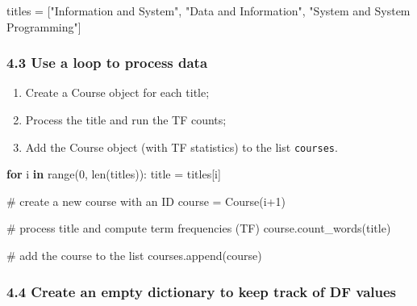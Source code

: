 \documentclass[
  letterpaper,
]{scrbook}
\newenvironment{Shaded}{\begin{snugshade}}{\end{snugshade}}
\newcommand{\BuiltInTok}[1]{\textcolor[rgb]{0.00,0.23,0.31}{#1}}
\newcommand{\CommentTok}[1]{\textcolor[rgb]{0.37,0.37,0.37}{#1}}
\newcommand{\ControlFlowTok}[1]{\textcolor[rgb]{0.00,0.23,0.31}{\textbf{#1}}}
\newcommand{\DecValTok}[1]{\textcolor[rgb]{0.68,0.00,0.00}{#1}}
\newcommand{\KeywordTok}[1]{\textcolor[rgb]{0.00,0.23,0.31}{\textbf{#1}}}
\newcommand{\NormalTok}[1]{\textcolor[rgb]{0.00,0.23,0.31}{#1}}
\newcommand{\OperatorTok}[1]{\textcolor[rgb]{0.37,0.37,0.37}{#1}}
\newcommand{\StringTok}[1]{\textcolor[rgb]{0.13,0.47,0.30}{#1}}
\providecommand{\tightlist}{%
  \setlength{\itemsep}{0pt}\setlength{\parskip}{0pt}}
\begin{document}
\begin{Shaded}
\begin{Highlighting}[]
\NormalTok{titles }\OperatorTok{=}\NormalTok{ [}\StringTok{"Information and System"}\NormalTok{, }\StringTok{"Data and Information"}\NormalTok{, }\StringTok{"System and System Programming"}\NormalTok{]}
\end{Highlighting}
\end{Shaded}

\subsubsection*{4.3 Use a loop to process
data}\label{use-a-loop-to-process-data}

\begin{enumerate}
\def\labelenumi{\arabic{enumi}.}
\tightlist
\item
  Create a Course object for each title;
\item
  Process the title and run the TF counts;
\item
  Add the Course object (with TF statistics) to the list
  \texttt{courses}.
\end{enumerate}

\begin{Shaded}
\begin{Highlighting}[]
\ControlFlowTok{for}\NormalTok{ i }\KeywordTok{in} \BuiltInTok{range}\NormalTok{(}\DecValTok{0}\NormalTok{, }\BuiltInTok{len}\NormalTok{(titles)):}
\NormalTok{    title }\OperatorTok{=}\NormalTok{ titles[i]}
    
    \CommentTok{\# create a new course with an ID}
\NormalTok{    course }\OperatorTok{=}\NormalTok{ Course(i}\OperatorTok{+}\DecValTok{1}\NormalTok{)}
    
    \CommentTok{\# process title and compute term frequencies (TF)}
\NormalTok{    course.count\_words(title)}
    
    \CommentTok{\# add the course to the list}
\NormalTok{    courses.append(course)}
\end{Highlighting}
\end{Shaded}

\subsubsection*{4.4 Create an empty dictionary to keep track of DF
values}\label{create-an-empty-dictionary-to-keep-track-of-df-values}
\end{document}

